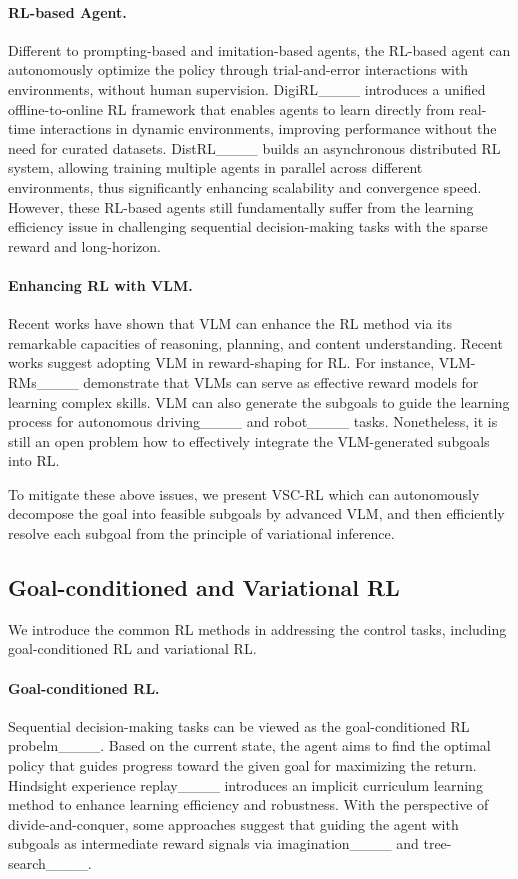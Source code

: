 \paragraph{RL-based Agent.}
Different to prompting-based and imitation-based agents, the RL-based agent can autonomously optimize the policy through trial-and-error interactions with environments, without human supervision.
DigiRL____ introduces a unified offline-to-online RL framework that enables agents to learn directly from real-time interactions in dynamic environments, improving performance without the need for curated datasets.
DistRL____ builds an asynchronous distributed RL system, allowing training multiple agents in parallel across different environments, thus significantly enhancing scalability and convergence speed.
However, these RL-based agents still fundamentally suffer from the learning efficiency issue in challenging sequential decision-making tasks with the sparse reward and long-horizon.


\paragraph{Enhancing RL with VLM.}
Recent works have shown that VLM can enhance the RL method via its remarkable capacities of reasoning, planning, and content understanding.
Recent works suggest adopting VLM in reward-shaping for RL.
For instance, VLM-RMs____ demonstrate that VLMs can serve as effective reward models for learning complex skills.
VLM can also generate the subgoals to guide the learning process for autonomous driving____ and robot____ tasks.
Nonetheless, it is still an open problem how to effectively integrate the VLM-generated subgoals into RL.

To mitigate these above issues, we present VSC-RL which can autonomously decompose the goal into feasible subgoals by advanced VLM, and then efficiently resolve each subgoal from the principle of variational inference.


\subsection{Goal-conditioned and Variational RL}
We introduce the common RL methods in addressing the control tasks, including goal-conditioned RL and variational RL.

\paragraph{Goal-conditioned RL.}
Sequential decision-making tasks can be viewed as the goal-conditioned RL probelm____.
Based on the current state, the agent aims to find the optimal policy that guides progress toward the given goal for maximizing the return.
Hindsight experience replay____ introduces an implicit curriculum learning method to enhance learning efficiency and robustness.
With the perspective of divide-and-conquer, some approaches suggest that guiding the agent with subgoals as intermediate reward signals via imagination____ and tree-search____.


